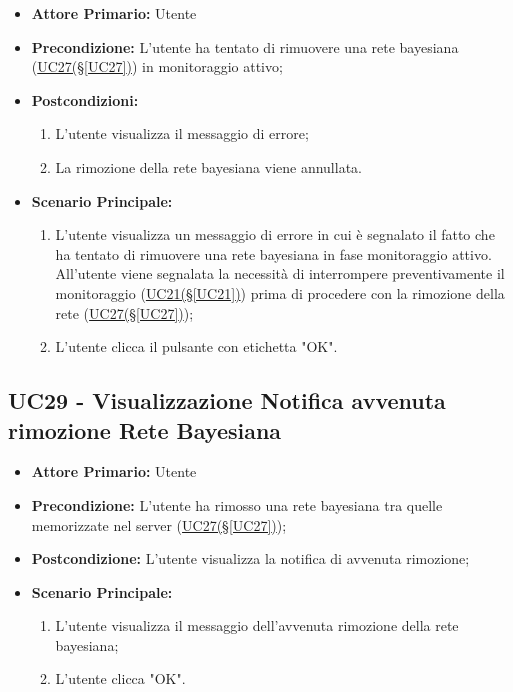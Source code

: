 \begin{itemize}
	\item \textbf{Attore Primario:} Utente
	\item \textbf{Precondizione:} L'utente ha tentato di rimuovere una rete bayesiana (\hyperref[UC27]{UC27(§\ref*{UC27})}) in monitoraggio attivo;
	\item \textbf{Postcondizioni:}
	\begin{enumerate}
		\item L'utente visualizza il messaggio di errore;
		\item La rimozione della rete bayesiana viene annullata.
	\end{enumerate}
	\item \textbf{Scenario Principale:}
	\begin{enumerate}
		\item L'utente visualizza un messaggio di errore in cui è segnalato il fatto che ha tentato di rimuovere una rete bayesiana in fase monitoraggio attivo. All'utente viene segnalata la necessità di interrompere preventivamente il monitoraggio (\hyperref[UC21]{UC21(§\ref*{UC21})}) prima di procedere con la rimozione della rete (\hyperref[UC27]{UC27(§\ref*{UC27})});
		\item L'utente clicca il pulsante con etichetta "OK".
	\end{enumerate}
\end{itemize}

\pagebreak

\subsection{UC29 - Visualizzazione Notifica avvenuta rimozione Rete Bayesiana}\label{UC29}

\begin{itemize}
	\item \textbf{Attore Primario:} Utente
	\item \textbf{Precondizione:} L'utente ha rimosso una rete bayesiana tra quelle memorizzate nel server (\hyperref[UC27]{UC27(§\ref*{UC27})});
	\item \textbf{Postcondizione:} L'utente visualizza la notifica di avvenuta rimozione;
	\item \textbf{Scenario Principale:}
	\begin{enumerate}
		\item L'utente visualizza il messaggio dell'avvenuta rimozione della rete bayesiana;
		\item L'utente clicca "OK".
	\end{enumerate}
\end{itemize}

